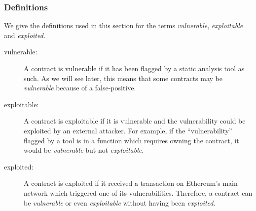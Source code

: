 \subsubsection{Definitions}
\label{ssec:definitions}
We give the definitions used in this section for the terms \emph{vulnerable}, \emph{exploitable} and \emph{exploited}.
\begin{description}
	\item[vulnerable:]
		A contract is vulnerable if it has been flagged by a static analysis tool as such.
		As we will see later, this means that some contracts may be \emph{vulnerable} because of a false-positive.
	\item[exploitable:]
		A contract is exploitable if it is vulnerable and the vulnerability could be exploited by an external attacker.
		For example, if the ``vulnerability'' flagged by a tool is in a function which requires owning the contract, it would be \emph{vulnerable} but not \emph{exploitable}.
	\item[exploited:]
		A contract is exploited if it received a transaction on Ethereum's main network which triggered one of its vulnerabilities.
		Therefore, a contract can be \emph{vulnerable} or even \emph{exploitable} without having been \emph{exploited}.
\end{description}
